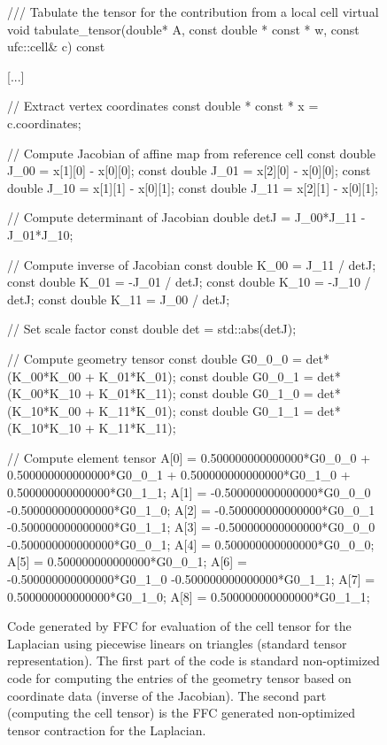 \begin{figure}
  \scriptsize
  \begin{c++}
/// Tabulate the tensor for the contribution from a local cell
virtual void tabulate_tensor(double* A,
                             const double * const * w,
                             const ufc::cell& c) const
{
  [...]

  // Extract vertex coordinates
  const double * const * x = c.coordinates;

  // Compute Jacobian of affine map from reference cell
  const double J_00 = x[1][0] - x[0][0];
  const double J_01 = x[2][0] - x[0][0];
  const double J_10 = x[1][1] - x[0][1];
  const double J_11 = x[2][1] - x[0][1];

  // Compute determinant of Jacobian
  double detJ = J_00*J_11 - J_01*J_10;

  // Compute inverse of Jacobian
  const double K_00 =  J_11 / detJ;
  const double K_01 = -J_01 / detJ;
  const double K_10 = -J_10 / detJ;
  const double K_11 =  J_00 / detJ;

  // Set scale factor
  const double det = std::abs(detJ);

  // Compute geometry tensor
  const double G0_0_0 = det*(K_00*K_00 + K_01*K_01);
  const double G0_0_1 = det*(K_00*K_10 + K_01*K_11);
  const double G0_1_0 = det*(K_10*K_00 + K_11*K_01);
  const double G0_1_1 = det*(K_10*K_10 + K_11*K_11);

  // Compute element tensor
  A[0] = 0.500000000000000*G0_0_0 +
         0.500000000000000*G0_0_1 +
         0.500000000000000*G0_1_0 +
         0.500000000000000*G0_1_1;
  A[1] = -0.500000000000000*G0_0_0
         -0.500000000000000*G0_1_0;
  A[2] = -0.500000000000000*G0_0_1
         -0.500000000000000*G0_1_1;
  A[3] = -0.500000000000000*G0_0_0
         -0.500000000000000*G0_0_1;
  A[4] = 0.500000000000000*G0_0_0;
  A[5] = 0.500000000000000*G0_0_1;
  A[6] = -0.500000000000000*G0_1_0
         -0.500000000000000*G0_1_1;
  A[7] = 0.500000000000000*G0_1_0;
  A[8] = 0.500000000000000*G0_1_1;
}
  \end{c++}
  \caption{Code generated by FFC for evaluation of the cell tensor
    for the Laplacian using piecewise linears on triangles (standard
    tensor representation). The first part of the code is standard
    non-optimized code for computing the entries of the geometry
    tensor based on coordinate data (inverse of the Jacobian). The
    second part (computing the cell tensor) is the FFC generated
    non-optimized tensor contraction for the Laplacian.}
  \label{fig:code,poisson}
\end{figure}

